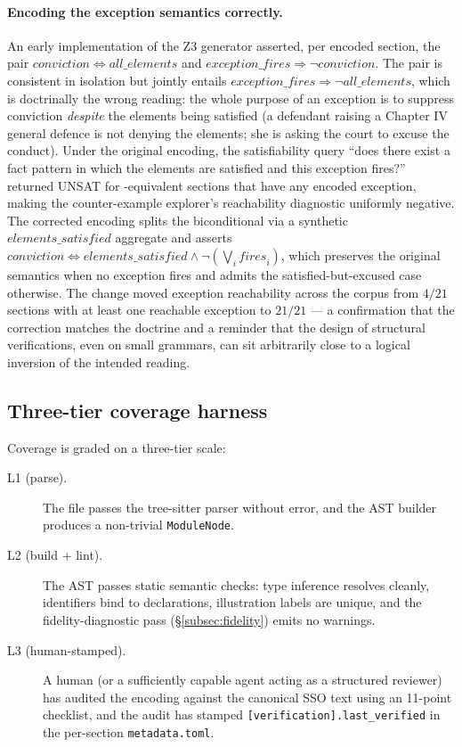 \paragraph{Encoding the exception semantics correctly.} An early
implementation of the Z3 generator asserted, per encoded section,
the pair
$\mathit{conviction} \Leftrightarrow \mathit{all\_elements}$ and
$\mathit{exception\_fires} \Rightarrow \neg\mathit{conviction}$.
The pair is consistent in isolation but jointly entails
$\mathit{exception\_fires} \Rightarrow \neg\mathit{all\_elements}$,
which is doctrinally the wrong reading: the whole purpose of an
exception is to suppress conviction \emph{despite} the elements
being satisfied (a defendant raising a Chapter IV general defence
is not denying the elements; she is asking the court to excuse the
conduct). Under the original encoding, the satisfiability query
``does there exist a fact pattern in which the elements are
satisfied and this exception fires?'' returned UNSAT for
\statRawSections{}-equivalent sections that have any encoded
exception, making the counter-example explorer's reachability
diagnostic uniformly negative. The corrected encoding splits the
biconditional via a synthetic
$\mathit{elements\_satisfied}$ aggregate and asserts
$\mathit{conviction} \Leftrightarrow \mathit{elements\_satisfied}
\wedge \neg(\bigvee_i \mathit{fires}_i)$,
which preserves the original semantics when no exception fires and
admits the satisfied-but-excused case otherwise. The change moved
exception reachability across the corpus from $4/21$ sections with
at least one reachable exception to $21/21$ --- a confirmation that
the correction matches the doctrine and a reminder that the design
of structural verifications, even on small grammars, can sit
arbitrarily close to a logical inversion of the intended reading.

\subsection{Three-tier coverage harness}
\label{subsec:coverage}
Coverage is graded on a three-tier scale:
\begin{description}
\item[L1 (parse).] The file passes the tree-sitter parser without error,
and the AST builder produces a non-trivial \texttt{ModuleNode}.
\item[L2 (build + lint).] The AST passes static semantic checks: type
inference resolves cleanly, identifiers bind to declarations,
illustration labels are unique, and the fidelity-diagnostic pass
(\S\ref{subsec:fidelity}) emits no warnings.
\item[L3 (human-stamped).] A human (or a sufficiently capable agent
acting as a structured reviewer) has audited the encoding against the
canonical SSO text using an 11-point checklist, and the audit has
stamped \texttt{[verification].last\_verified} in the per-section
\texttt{metadata.toml}.
\end{description}

